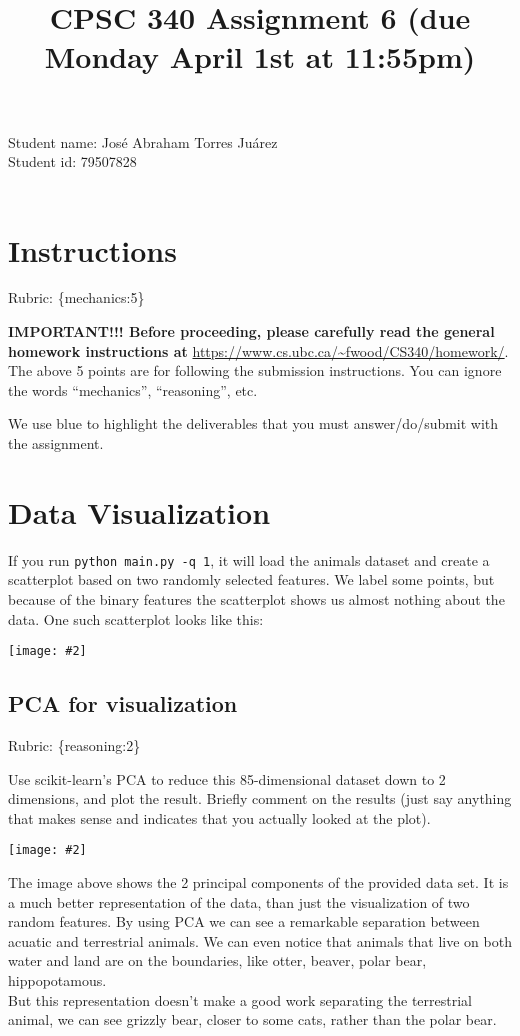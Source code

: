 \documentclass{article}
\def\rubric#1{\gre{Rubric: \{#1\}}}{}
\def\blu#1{{\color{blu}#1}}
\def\gre#1{{\color{gre}#1}}
\def\ans#1{{\color{ans}#1}}
\newcommand{\centerfig}[2]{\begin{center}\texttt{[image: \#2]}\end{center}}
\begin{document}
\title{CPSC 340 Assignment 6 (due Monday April 1st at 11:55pm)}
\date{}
\maketitle

\vspace{-4em}
\ans{
    Student name: José Abraham Torres Juárez \\
    Student id: 79507828 \\ \\
}


\section*{Instructions}
\rubric{mechanics:5}

\textbf{IMPORTANT!!! Before proceeding, please carefully read the general homework instructions at} \url{https://www.cs.ubc.ca/~fwood/CS340/homework/}. The above 5 points are for following the submission instructions. You can ignore the words ``mechanics'', ``reasoning'', etc.

\vspace{1em}
We use \blu{blue} to highlight the deliverables that you must answer/do/submit with the assignment.

\section{Data Visualization}

If you run \verb|python main.py -q 1|, it will load the animals dataset and create a scatterplot based on two randomly selected features.
We label some points, but because of the binary features the scatterplot shows us almost nothing about the data. One such scatterplot looks like this:

\centerfig{.5}{../figs/two_random_features.png}

\subsection{PCA for visualization}
\rubric{reasoning:2}

Use scikit-learn's PCA to reduce this 85-dimensional dataset down to 2 dimensions, and plot the result. Briefly comment on the results (just say anything that makes sense and indicates that you actually looked at the plot).
\centerfig{.5}{../figs/pca_2_features.png}
\ans{
    The image above shows the 2 principal components of the provided data set. It is a much better representation of the data, 
    than just the visualization of two random features. By using PCA we can see a remarkable separation between acuatic and 
    terrestrial animals. We can even notice that animals that live on both water and land are on the boundaries, like otter, 
    beaver, polar bear, hippopotamous. \\ 
    But this representation doesn't make a good work separating the terrestrial animal, we can see grizzly bear, closer to 
    some cats, rather than the polar bear.
}
\end{document}
